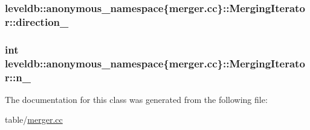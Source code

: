 \subsubsection[{direction\+\_\+}]{ leveldb\+::anonymous\+\_\+namespace\{merger.\+cc\}\+::Merging\+Iterator\+::direction\+\_\+\hspace{0.3cm}{\ttfamily [private]}}\label{classleveldb_1_1anonymous__namespace_02merger_8cc_03_1_1_merging_iterator_a46e0b476397560b1752bae5ecbba71fd}
\hypertarget{classleveldb_1_1anonymous__namespace_02merger_8cc_03_1_1_merging_iterator_a85e899d8a1f38b5231681b3ad3f11328}{}
\subsubsection[{n\+\_\+}]{\setlength{\rightskip}{0pt plus 5cm}int leveldb\+::anonymous\+\_\+namespace\{merger.\+cc\}\+::Merging\+Iterator\+::n\+\_\+\hspace{0.3cm}{\ttfamily [private]}}\label{classleveldb_1_1anonymous__namespace_02merger_8cc_03_1_1_merging_iterator_a85e899d8a1f38b5231681b3ad3f11328}


The documentation for this class was generated from the following file\+:\begin{DoxyCompactItemize}
\item 
table/\hyperlink{merger_8cc}{merger.\+cc}\end{DoxyCompactItemize}
